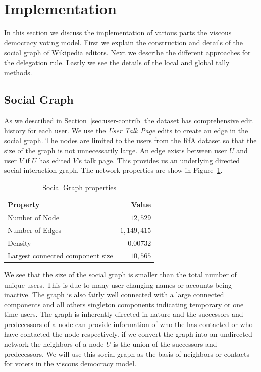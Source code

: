 \section{Implementation}
\label{sec:implementation}
In this section we discuss the implementation of various parts the viscous democracy voting model. First we explain the construction and details of the social graph of Wikipedia editors. Next we describe the different approaches for the delegation rule. Lastly we see the details of the local and global tally methods.

\subsection{Social Graph}
As we described in Section~\ref{sec:user-contrib} the \usercontrib dataset has comprehensive edit history for each user. We use the \textit{User Talk Page} edits to create an edge in the social graph. The nodes are limited to the users from the  RfA dataset so that the size of the graph is not unnecessarily large. An edge exists between user $U$ and user $V$ if $U$ has edited $V$'s talk page. This provides us an underlying directed social interaction graph. The network properties are show in Figure~\ref{tab:social-graph}.

\begin{table}
    \centering
    \begin{tabular}{lr}
        \toprule
        \textbf{Property}& \textbf{Value} \\
        \midrule
        Number of Node & $12,529$ \\
        Number of Edges & $1,149,415$ \\
        Density & $0.00732$\\
        Largest connected component size &$10,565$\\
        \bottomrule
    \end{tabular}
    \caption{Social Graph properties}
    \label{tab:social-graph}
\end{table}
\smallskip

We see that the size of the social graph is smaller than the total number of unique users. This is due to many user changing names or accounts being inactive. The graph is also fairly well connected with a large connected components and all others singleton components indicating temporary or one time users. The graph is inherently directed in nature and the successors and predecessors of a node can provide information of who the has contacted or who have contacted the node respectively. if we convert the graph into an undirected network the neighbors of a node $U$ is the union of the successors and predecessors. We will use this social graph as the basis of neighbors or contacts for voters in the viscous democracy model.

